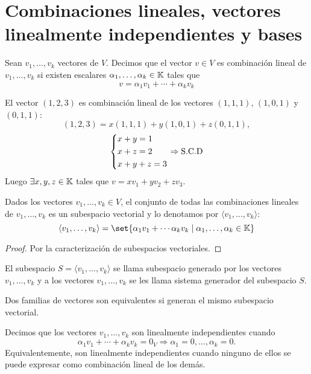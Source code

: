\section{Combinaciones lineales, vectores linealmente independientes y bases}
\begin{definition}
	Sean \(v_1, \ldots, v_k \) vectores de \(V \). Decimos que el vector \(v \in V \) es combinación lineal de \(v_1, \ldots, v_k \) si existen escalares \(\alpha_1, \ldots, \alpha_k \in \mathbb{K} \) tales que
	\[
		v = \alpha_1 v_1 + \cdots + \alpha_k v_k
	\]
\end{definition}
\begin{example}
	El vector \((1,2,3 )\) es combinación lineal de los vectores \((1,1,1)\), \((1,0,1)\) y \((0,1,1)\):
	\[
		(1,2,3) = x(1,1,1) + y(1,0,1) + z(0,1,1),
	\]
	\[
		\begin{dcases}
			x + y = 1 \\
			x + z = 2 \\
			x + y + z = 3
		\end{dcases} \Rightarrow \text{S.C.D}
	\]
	Luego \(\exists x,y,z \in \mathbb{K}\) tales que \(v = x v_1 + y v_2 + z v_3 \).
\end{example}
\begin{lemma}
	Dados los vectores \(v_1, \ldots, v_k \in V \), el conjunto de todas las combinaciones lineales de \(v_1, \ldots, v_k \) es un subespacio vectorial y lo denotamos por \(\langle v_1, \ldots, v_k \rangle\):
	\[
		\langle v_1, \ldots, v_k \rangle = \set{\alpha_1 v_1 + \cdots \alpha_k v_k \mid \alpha_1, \ldots, \alpha_k \in \K }
	\]
\end{lemma}
\begin{proof}
	Por la caracterización de subespacios vectoriales.
\end{proof}
\begin{definition}
	El subespacio \(S = \langle v_1, \ldots, v_k \rangle \) se llama subespacio generado por los vectores \(v_1, \ldots, v_k \) y a los vectores \(v_1, \ldots, v_k \) se les llama sistema generador del subespacio \(S \).
\end{definition}
Dos familias de vectores son equivalentes si generan el mismo subespacio vectorial.
\begin{definition}
	Decimos que los vectores \(v_1, \ldots, v_k \) son linealmente independientes cuando
	\[
		\alpha_1 v_1 + \cdots + \alpha_k v_k = 0_V \Rightarrow \alpha_1 = 0, \ldots, \alpha_k = 0.
	\]
	Equivalentemente, son linealmente independientes cuando ninguno de ellos se puede expresar como combinación lineal de los demás.

\end{definition}
